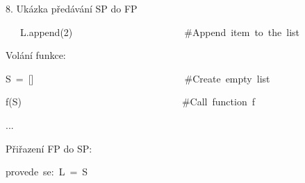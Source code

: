 \documentclass[czech]{beamer}
\newenvironment{lyxcode}
  {\par\begin{list}{}{
    \setlength{\rightmargin}{\leftmargin}
    \setlength{\listparindent}{0pt}%
    \raggedright
    \setlength{\itemsep}{0pt}
    \setlength{\parsep}{0pt}
    \normalfont\ttfamily}%
   \def\{{\char`\{}
   \def\}{\char`\}}
   \def\textasciitilde{\char`\~}
   \item[]}
  {\end{list}}
\begin{document}
\begin{frame}[plain]{8. Ukázka předávání SP do FP}
\begin{lyxcode}
{\scriptsize ~~~L.append(2)~~~~~~~~~~~~~~~~~~~~~~~\#Append~item~to~the~list}{\scriptsize\par}
\end{lyxcode}
{\scriptsize Volání funkce:}{\scriptsize\par}
\begin{lyxcode}
{\scriptsize S~=~{[}{]}~~~~~~~~~~~~~~~~~~~~~~~~~~~~~~~\#Create~empty~list}{\scriptsize\par}

{\scriptsize f(S)~~~~~~~~~~~~~~~~~~~~~~~~~~~~~~~~~\#Call~function~f}{\scriptsize\par}

{\scriptsize ...}{\scriptsize\par}
\end{lyxcode}
{\scriptsize Přiřazení FP do SP:}{\scriptsize\par}
\begin{lyxcode}
{\scriptsize provede~se:~L~=~S~}{\scriptsize\par}
\end{lyxcode}
\end{frame}
\end{document}
